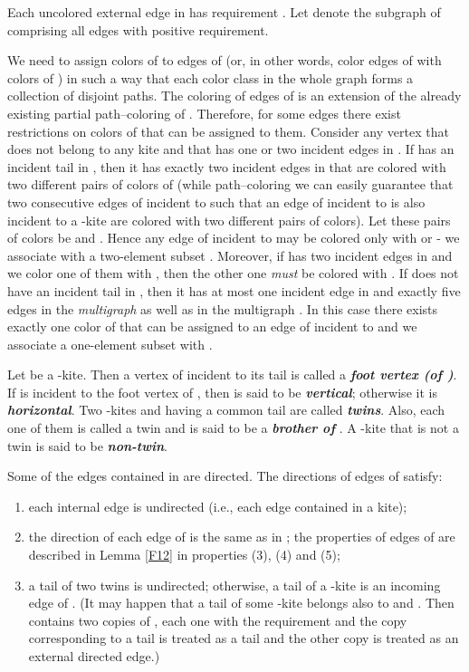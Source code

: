 \documentclass[a4, 11pt]{article}
\newcommand{\<}{\langle}
\renewcommand{\>}{\rangle}
\begin{document}
Each uncolored external edge  in  has requirement . 
Let  denote the subgraph of  comprising all edges  with positive requirement.




We need to assign colors of  to edges of  (or, in other words, color edges of  with colors of ) in such a way that each color class in the whole graph   forms a collection of disjoint paths. The coloring of edges of  is an extension of the already existing partial path--coloring of . Therefore, for some edges there exist restrictions on colors of  that can be assigned to them. Consider any vertex  that does not belong to any kite and that has one or two incident edges in . If  has an incident tail in , then it has exactly two incident edges in    that are colored with two different pairs of colors of  (while path--coloring  we can easily guarantee that two consecutive edges of  incident to  such that an edge of  incident to  is also incident to a -kite are colored with two different pairs of colors). Let these pairs of colors be  and . Hence any edge of  incident to  may be colored only with  or  - we associate with   a  two-element subset .  Moreover, if   has two incident edges in  and we color one of them with , then the other one {\em must} be colored with .  If  does not have an incident tail in , then it has at most one incident edge in  and exactly five edges in the {\em multigraph}  as well as in the multigraph  . In this case there exists exactly one color   of  that can be assigned to an edge of  incident to  and we associate a one-element subset  with .


Let  be a -kite. Then a vertex of  incident to its tail  is called a {\bf \em foot vertex (of )}. If  is incident to the foot vertex of , then  is said to be {\bf \em vertical}; otherwise it is {\bf \em horizontal}.
Two -kites  and  having a common tail are called {\bf \em twins}. Also, each one of them is called a twin and  is said to be a {\bf \em brother of }. A -kite that is not a twin is said to be {\bf \em non-twin}.

Some of the edges contained in  are directed.  The directions of edges of  satisfy:

\begin{enumerate}
\item each internal edge is undirected (i.e., each edge contained in a kite);
\item the direction of each edge of  is the same as in ; the properties of edges of  are described in Lemma \ref{F12} in properties (3), (4) and (5);

\item a tail of  two twins is undirected; otherwise, a tail of a -kite  is an incoming edge of . (It may happen that a tail  of some -kite belongs also to  and . Then  contains two copies of , each one with the requirement  and the copy corresponding to a tail is treated as a tail and the other copy is treated as an external directed edge.)
\end{enumerate} 
\end{document}
